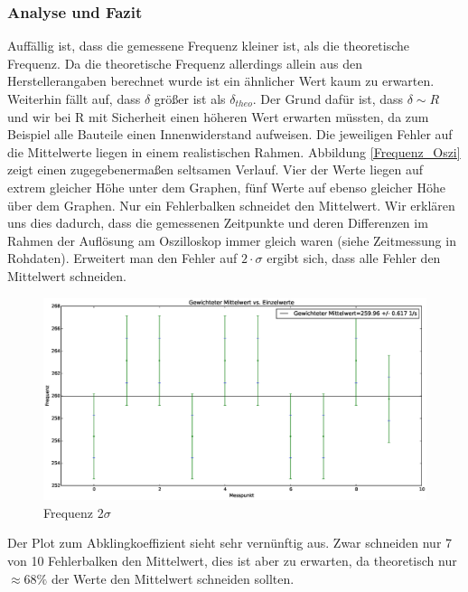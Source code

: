 \documentclass[12pt,a4paper]{article}
\begin{document}
\subsubsection{Analyse und Fazit}
Auffällig ist, dass die gemessene Frequenz kleiner ist, als die theoretische Frequenz. Da die theoretische Frequenz allerdings allein aus den Herstellerangaben berechnet wurde ist ein ähnlicher Wert kaum zu erwarten. 
\newline
Weiterhin fällt auf, dass $\delta$ größer ist als $\delta_{theo}$. Der Grund dafür ist, dass $\delta \sim R$ und wir bei R mit Sicherheit einen höheren Wert erwarten müssten, da zum Beispiel alle Bauteile einen Innenwiderstand aufweisen. 
\newline
Die jeweiligen Fehler auf die Mittelwerte liegen in einem realistischen Rahmen.
\newline
Abbildung \ref{Frequenz_Oszi} zeigt einen zugegebenermaßen seltsamen Verlauf. Vier der Werte liegen auf extrem gleicher Höhe unter dem Graphen, fünf Werte auf ebenso gleicher Höhe über dem Graphen. Nur ein Fehlerbalken schneidet den Mittelwert. Wir erklären uns dies dadurch,  dass die gemessenen Zeitpunkte und deren Differenzen im Rahmen der Auflösung am Oszilloskop immer gleich waren (siehe Zeitmessung in Rohdaten).   
\newline
Erweitert man den Fehler auf $2\cdot\sigma$ ergibt sich, dass alle Fehler den Mittelwert schneiden.  
\begin{figure}[H]
\caption{Frequenz 2$\sigma$ }
\centering
\includegraphics[scale=0.35]{Bilder/FrequenzGewichtetZweiSigma.eps}
\end{figure}

Der Plot zum Abklingkoeffizient sieht sehr vernünftig aus. Zwar schneiden nur 7 von 10 Fehlerbalken den Mittelwert, dies ist aber zu erwarten, da theoretisch nur $\approx 68\%$ der Werte den Mittelwert schneiden sollten.
\end{document}
